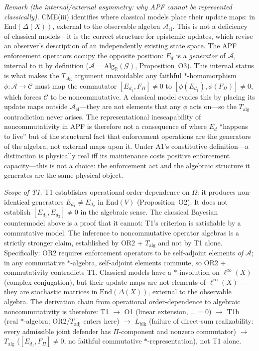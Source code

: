 \documentclass[11pt]{article}
\theoremstyle{remark}
\begin{document}
\begin{tcolorbox}[apfbox, title={Theorem T1 --- The Bridge Theorem (Order-Dependence)}]
\smallskip\noindent\textit{Remark (the internal/external asymmetry: why APF cannot be represented classically).}
CME(iii) identifies where classical models place their update maps: in $\mathrm{End}(\Delta(X))$, external to the observable algebra $\mathcal{A}_{\mathrm{cl}}$.  This is not a deficiency of classical models---it is the correct structure for epistemic updates, which revise an observer's description of an independently existing state space.  The APF enforcement operators occupy the opposite position: $E_d$ is a \emph{generator} of $\mathcal{A}$, internal to it by definition ($\mathcal{A} = \mathrm{Alg}_\mathbb{R}(\mathcal{G})$, Proposition~O3).  This internal status is what makes the $T_{\mathrm{alg}}$ argument unavoidable: any faithful $*$-homomorphism $\phi: \mathcal{A} \to \mathcal{C}$ must map the commutator $[E_{d_1}, F_\Pi] \ne 0$ to $[\phi(E_{d_1}), \phi(F_\Pi)] \ne 0$, which forces $\mathcal{C}$ to be noncommutative.  A classical model evades this by placing its update maps outside $\mathcal{A}_{\mathrm{cl}}$---they are not elements that any $\phi$ acts on---so the $T_{\mathrm{alg}}$ contradiction never arises.  The representational inescapability of noncommutativity in APF is therefore not a consequence of where $E_d$ ``happens to live'' but of the structural fact that enforcement operations are the generators of the algebra, not external maps upon it.  Under A1's constitutive definition---a distinction is physically real iff its maintenance costs positive enforcement capacity---this is not a choice: the enforcement act and the algebraic structure it generates are the same physical object.

\textit{Scope of T1.}  T1 establishes operational order-dependence on $\Omega$: it produces non-identical generators $E_{d_1} \ne E_{d_2}$ in $\mathrm{End}(V)$ (Proposition~O2).  It does not establish $[E_{d_1}, E_{d_2}] \ne 0$ in the algebraic sense.  The classical Bayesian countermodel above is a proof that it cannot: T1's criterion is satisfiable by a commutative model.  The inference to noncommutative operator algebras is a strictly stronger claim, established by OR2 + $T_{\mathrm{alg}}$ and not by T1 alone.  Specifically: OR2 requires enforcement operators to be self-adjoint elements \emph{of} $\mathcal{A}$; in any commutative $*$-algebra, self-adjoint elements commute, so OR2 + commutativity contradicts T1.  Classical models have a $*$-involution on $\ell^\infty(X)$ (complex conjugation), but their update maps are not elements of $\ell^\infty(X)$ --- they are stochastic matrices in $\mathrm{End}(\Delta(X))$, external to the observable algebra.  The derivation chain from operational order-dependence to algebraic noncommutativity is therefore: T1 $\to$ O1 (linear extension, $\bot = 0$) $\to$ T1b (real $*$-algebra; OR2/$T_{\mathrm{adj}}$ enters here) $\to$ $L_{\mathrm{blk}}$ (failure of direct-sum realizability: every admissible joint defender has $\Pi$-component and nonzero commutator) $\to$ $T_{\mathrm{alg}}$ ($[E_{d_1}, F_\Pi] \ne 0$, no faithful commutative $*$-representation), not T1 alone.


\end{tcolorbox}
\end{document}
